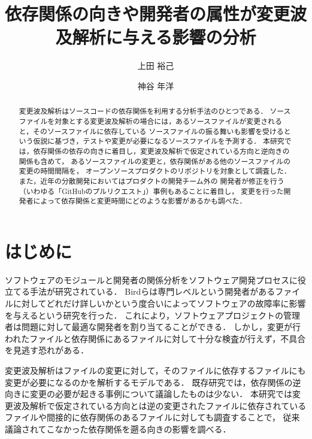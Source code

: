 \documentclass{fose2016}           %
\title{依存関係の向きや開発者の属性が変更波及解析に与える影響の分析}
\author{上田 裕己}{Ueda Yuki,島根大学総合理工学部}
\author{神谷 年洋}{Kamiya Toshihiro,島根大学総合理工学研究科}
\begin{document}
\maketitle

\begin{abstract}
変更波及解析はソースコードの依存関係を利用する分析手法のひとつである．
ソースファイルを対象とする変更波及解析の場合には，あるソースファイルが変更されると，そのソースファイルに依存している
ソースファイルの振る舞いも影響を受けるという仮説に基づき，テストや変更が必要になるソースファイルを予測する．
本研究では，依存関係の依存の向きに着目し，変更波及解析で仮定されている方向と逆向きの関係も含めて，
あるソースファイルの変更と，依存関係がある他のソースファイルの変更の時間間隔を，
オープンソースプロダクトのリポジトリを対象として調査した．
また，近年の分散開発においてはプロダクトの開発チーム外の
開発者が修正を行う（いわゆる「GitHubのプルリクエスト」）事例もあることに着目し，
変更を行った開発者によって依存関係と変更時間にどのような影響があるかも調べた．

\end{abstract}



\section{はじめに} 
ソフトウェアのモジュールと開発者の関係分析をソフトウェア開発プロセスに役立てる手法が研究されている\cite{Bird,Thongtanunam}．
Bird\cite{Bird}らは専門レベルという開発者があるファイルに対してどれだけ詳しいかという度合いによってソフトウェアの故障率に影響を与えるという研究を行った．
これにより，ソフトウェアプロジェクトの管理者は問題に対して最適な開発者を割り当てることができる．
しかし，変更が行われたファイルと依存関係にあるファイルに対して十分な検査が行えず，不具合を見逃す恐れがある．

変更波及解析はファイルの変更に対して，そのファイルに依存するファイルにも変更が必要になるのかを解析するモデルである．
既存研究では，依存関係の逆向きに変更の必要が起きる事例について議論したもの\cite{Beszedes}は少ない．
本研究では変更波及解析で仮定されている方向とは逆の変更されたファイルに依存されているファイルや間接的に依存関係のあるファイルに対しても調査することで，
従来議論されてこなかった依存関係を遡る向きの影響を調べる．
\end{document}
